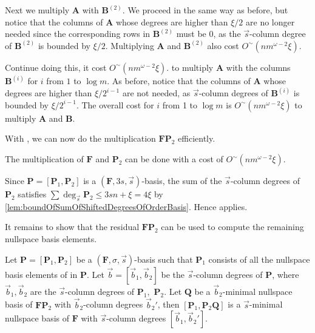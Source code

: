 \begin{pf}
Next we multiply $\mathbf{A}$ with $\mathbf{B}^{(2)}$. We proceed
in the same way as before, but notice that the columns of $\mathbf{A}$
whose degrees are higher than $\xi/2$ are no longer needed since
the corresponding rows in $\mathbf{B}^{(2)}$ must be 0, as the $\vec{s}$-column
degree of $\mathbf{B}^{(2)}$ is bounded by $\xi/2$. Multiplying
$\mathbf{A}$ and $\mathbf{B}^{(2)}$ also cost $O^{\sim}\left(nm^{\omega-2}\xi\right)$.

Continue doing this, it cost $O^{\sim}\left(nm^{\omega-2}\xi\right)$.
to multiply $\mathbf{A}$ with the columns $\mathbf{B}^{(i)}$ for
$i$ from $1$ to $\log m$.  As before, notice that the columns of
$\mathbf{A}$ whose degrees are higher than $\xi/2^{i-1}$ are not
needed, as $\vec{s}$-column degrees of $\mathbf{B}^{(i)}$ is bounded
by $\xi/2^{i-1}$. The overall cost for $i$ from 1 to $\log m$ is
$O^{\sim}\left(nm^{\omega-2}\xi\right)$ to multiply $\mathbf{A}$
and $\mathbf{B}$. 
\end{pf}
With , we can now do the
multiplication $\mathbf{F}\mathbf{P}_{2}$ efficiently.
\begin{cor}
\label{cor:multiplyingFP2}The multiplication of $\mathbf{F}$ and
$\mathbf{P}_{2}$ can be done with a cost of $O^{\sim}\left(nm^{\omega-2}\xi\right)$.\end{cor}
\begin{pf}
Since $\mathbf{P}=[\mathbf{P}_{1},\mathbf{P}_{2}]$ is a $(\mathbf{F},3s,\vec{s})$-basis,
the sum of the $\vec{s}$-column degrees of $\mathbf{P}_{2}$ satisfies
$\sum\deg_{\vec{s}}\mathbf{P}_{2}\le3sn+\xi=4\xi$ by \ref{lem:boundOfSumOfShiftedDegreesOfOrderBasis}.
Hence  applies.
\end{pf}
It remains to show that the residual $\mathbf{F}\mathbf{P}_{2}$ can
be used to compute the remaining nullspace basis elements.
\begin{lem}
\label{lem:continueComputingNullspaceBasisByColumns}Let $\mathbf{P}=\left[\mathbf{P}_{1},\mathbf{P}_{2}\right]$
be a $\left(\mathbf{F},\sigma,\vec{s}\right)$-basis such that $\mathbf{P}_{1}$
consists of all the nullspace basis elements of in $\mathbf{P}$.
Let $\vec{b}=\left[\vec{b}_{1},\vec{b}_{2}\right]$ be the $\vec{s}$-column
degrees of $\mathbf{P}$, where $\vec{b}_{1},\vec{b}_{2}$ are the
$\vec{s}$-column degrees of $\mathbf{P}_{1},$ $\mathbf{P}_{2}$.
Let $\mathbf{Q}$ be a $\vec{b}_{2}$-minimal nullspace basis of $\mathbf{F}\mathbf{P}_{2}$
with $\vec{b}_{2}$-column degrees $\vec{b}_{2}'$, then $\left[\mathbf{P}_{1},\mathbf{P}_{2}\mathbf{Q}\right]$
is a $\vec{s}$-minimal nullspace basis of $\mathbf{F}$ with $\vec{s}$-column
degrees $\left[\vec{b}_{1},\vec{b}_{2}'\right]$.\end{lem}
